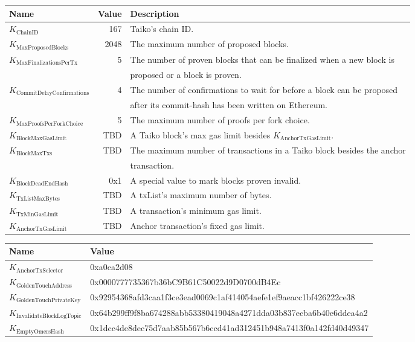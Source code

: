 \documentclass[9pt,oneside]{amsart}
\begin{document}
\begin{tabu}{l r l}
\toprule
Name & Value & Description \\
\midrule
$K_{\mathrm{ChainID}}$ & 167 & Taiko's chain ID. \\
$K_{\mathrm{MaxProposedBlocks}}$ & 2048 & The maximum number of proposed blocks. \\
$K_{\mathrm{MaxFinalizationsPerTx}}$ & 5 & The number of proven blocks that can be finalized when a new block is\\
& & proposed or a block is proven. \\
$K_{\mathrm{CommitDelayConfirmations}}$ & 4 & The number of confirmations to wait for before a block can be proposed\\
& &  after its commit-hash has been written on Ethereum.\\
$K_{\mathrm{MaxProofsPerForkChoice}}$ & 5 & The maximum number of proofs per fork choice. \\
$K_{\mathrm{BlockMaxGasLimit}}$ & TBD & A Taiko block's max gas limit besides $K_{\mathrm{AnchorTxGasLimit}}$.  \\
$K_{\mathrm{BlockMaxTxs}}$ & TBD & The maximum number of transactions in a Taiko block besides the anchor\\
& & transaction. \\
$K_{\mathrm{BlockDeadEndHash}}$ & 0x1 & A special value to mark blocks proven invalid. \\
$K_{\mathrm{TxListMaxBytes}}$ & TBD & A txList's maximum number of bytes. \\
$K_{\mathrm{TxMinGasLimit}}$ & TBD & A transaction's minimum gas limit. \\
$K_{\mathrm{AnchorTxGasLimit}}$ & TBD & Anchor transaction's fixed gas limit. \\
\bottomrule
\end{tabu}

\begin{tabu}{l l}
\toprule
Name &  \quad \quad Value \\
\midrule
$K_{\mathrm{AnchorTxSelector}}$ &  \quad \quad 0xa0ca2d08 \\
$K_{\mathrm{GoldenTouchAddress}}$ &  \quad \quad 0x0000777735367b36bC9B61C50022d9D0700dB4Ec  \\
$K_{\mathrm{GoldenTouchPrivateKey}}$ & \quad \quad 0x92954368afd3caa1f3ce3ead0069c1af414054aefe1ef9aeacc1bf426222ce38 \\
$K_{\mathrm{InvalidateBlockLogTopic}}$ & \quad \quad 0x64b299ff9f8ba674288abb53380419048a4271dda03b837ecba6b40e6ddea4a2 \\
$K_{\mathrm{EmptyOmersHash}}$ & \quad \quad 0x1dcc4de8dec75d7aab85b567b6ccd41ad312451b948a7413f0a142fd40d49347   \quad \quad \quad \quad \\
\bottomrule
\end{tabu}
\end{document}
